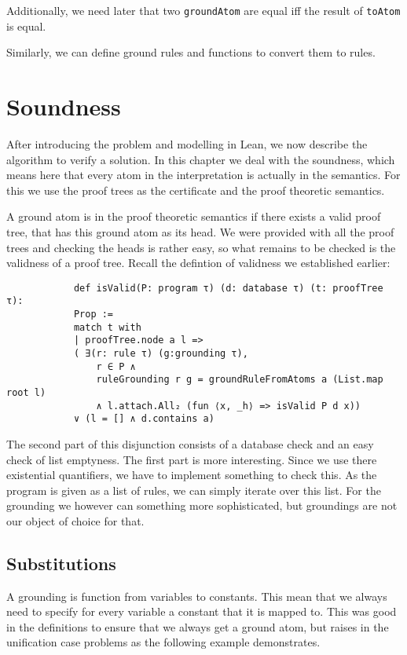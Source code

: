 \documentclass{article}
\begin{document}
        Additionally, we need later that two \texttt{groundAtom} are equal iff the result of \texttt{toAtom} is equal.

        Similarly, we can define ground rules and functions to convert them to rules.


    \section{Soundness}
        After introducing the problem and modelling in Lean, we now describe the algorithm to verify a solution. In this chapter we deal with the soundness, which means here that every atom in the interpretation is actually in the semantics. For this we use the proof trees as the certificate and the proof theoretic semantics.

        A ground atom is in the proof theoretic semantics if there exists a valid proof tree, that has this ground atom as its head. We were provided with all the proof trees and checking the heads is rather easy, so what remains to be checked is the validness of a proof tree. Recall the defintion of validness we established earlier:
        
        \begin{lstlisting}
            def isValid(P: program τ) (d: database τ) (t: proofTree τ): 
            Prop :=
            match t with
            | proofTree.node a l => 
            ( ∃(r: rule τ) (g:grounding τ), 
                r ∈ P ∧ 
                ruleGrounding r g = groundRuleFromAtoms a (List.map root l)
                ∧ l.attach.All₂ (fun ⟨x, _h⟩ => isValid P d x)) 
            ∨ (l = [] ∧ d.contains a)
        \end{lstlisting}

        The second part of this disjunction consists of a database check and an easy check of list emptyness. The first part is more interesting. Since we use there existential quantifiers, we have to implement something to check this. As the program is given as a list of rules, we can simply iterate over this list. For the grounding we however can something more sophisticated, but groundings are not our object of choice for that.
        
        \subsection{Substitutions}
            A grounding is function from variables to constants. This mean that we always need to specify for every variable a constant that it is mapped to. This was good in the definitions to ensure that we always get a ground atom, but raises in the unification case problems as the following example demonstrates.
\end{document}
